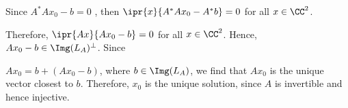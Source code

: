 \documentclass[11pt]{scrartcl}
\begin{document}
\begin{soln}
  Since $A^{*}Ax_0-b = 0$ , then $\ipr{x}{A^{*}Ax_0-A^{*}b} = 0$ for
  all $x\in \CC^2$.

  Therefore, $\ipr{Ax}{Ax_{0}-b}=0$ for all
  $x\in \CC^{2}$. Hence, $Ax_0 - b \in \Img(L_A)^{\bot}$. Since

  $Ax_0 = b + (Ax_0-b)$, where $b\in\Img(L_A)$, we find that $Ax_0$ is
  the unique vector closest to $b$. Therefore, $x_0$ is the unique solution, since $A$ is invertible and hence injective.






\end{soln}
\end{document}
